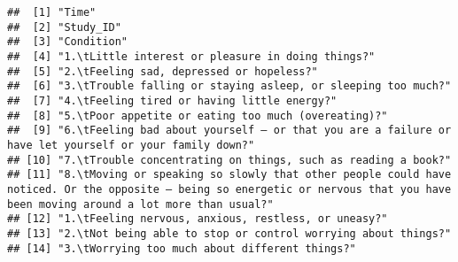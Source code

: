 \documentclass[
]{article}
\begin{document}
\begin{verbatim}
##  [1] "Time"                                                                                                                                                                          
##  [2] "Study_ID"                                                                                                                                                                      
##  [3] "Condition"                                                                                                                                                                     
##  [4] "1.\tLittle interest or pleasure in doing things?"                                                                                                                              
##  [5] "2.\tFeeling sad, depressed or hopeless?"                                                                                                                                       
##  [6] "3.\tTrouble falling or staying asleep, or sleeping too much?"                                                                                                                  
##  [7] "4.\tFeeling tired or having little energy?"                                                                                                                                    
##  [8] "5.\tPoor appetite or eating too much (overeating)?"                                                                                                                            
##  [9] "6.\tFeeling bad about yourself – or that you are a failure or have let yourself or your family down?"                                                                          
## [10] "7.\tTrouble concentrating on things, such as reading a book?"                                                                                                                  
## [11] "8.\tMoving or speaking so slowly that other people could have noticed. Or the opposite — being so energetic or nervous that you have been moving around a lot more than usual?"
## [12] "1.\tFeeling nervous, anxious, restless, or uneasy?"                                                                                                                            
## [13] "2.\tNot being able to stop or control worrying about things?"                                                                                                                  
## [14] "3.\tWorrying too much about different things?"                                                                                                                                 

\end{verbatim}
\end{document}
